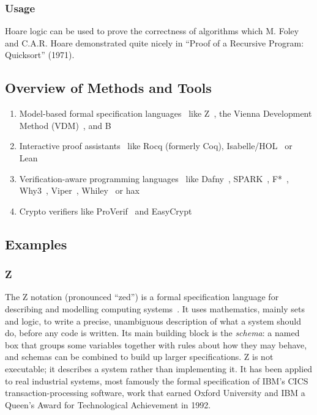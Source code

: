 \documentclass[conference]{IEEEtran}
\begin{document}
\subsubsection{\textbf{Usage}} Hoare logic can be used to prove the correctness of algorithms which M. Foley and C.A.R. Hoare demonstrated quite nicely in ``Proof of a Recursive Program: Quicksort'' (1971). \cite{foley1971quicksort}

\subsection{Overview of Methods and Tools}

\begin{enumerate}
    \raggedright
    \item Model-based formal specification languages~\cite{iotformalreview2024} like Z~\cite{spivey1992z}, the Vienna Development Method (VDM)~\cite{jones1990vdm}, and B~\cite{abrial1996bbook}
    \item Interactive proof assistants~\cite{dafny2026workshop} like Rocq (formerly Coq),\cite{rocq2025} Isabelle/HOL~\cite{nipkow2002isabelle} or Lean~\cite{demoura2015lean}
    \item Verification-aware programming languages~\cite{dafny2026workshop} like Dafny~\cite{leino2010dafny}, SPARK~\cite{mccormick2015spark}, F*~\cite{swamy2016fstar}, Why3~\cite{filliatre2013why3}, Viper~\cite{mueller2016viper}, Whiley~\cite{pearce2013whiley} or hax~\cite{bhargavan2025hax}
    \item Crypto verifiers like ProVerif~\cite{blanchet2001proverif} and EasyCrypt~\cite{barthe2011easycrypt}
\end{enumerate}

\subsection{Examples}

\subsubsection{\textbf{Z}}

The Z notation (pronounced ``zed'') is a formal specification language for describing and modelling computing systems~\cite{spivey1992z, z_wiki}. It uses mathematics, mainly sets and logic, to write a precise, unambiguous description of what a system should do, before any code is written. Its main building block is the \emph{schema}: a named box that groups some variables together with rules about how they may behave, and schemas can be combined to build up larger specifications. Z is not executable; it describes a system rather than implementing it. It has been applied to real industrial systems, most famously the formal specification of IBM's CICS transaction-processing software, work that earned Oxford University and IBM a Queen's Award for Technological Achievement in 1992.
\end{document}
